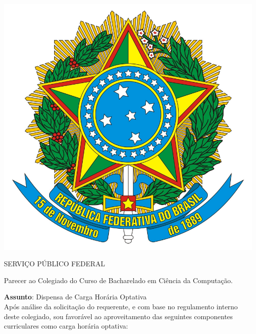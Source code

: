 \documentclass[10pt]{scrartcl}
\begin{document}
	\begin{minipage}{0.08\textwidth}
	\includegraphics[width=\textwidth]{republica} 
	\end{minipage} 
	\begin{minipage}{5.5cm}
	\centering
	SERVI\c{C}O PÚBLICO FEDERAL
	\end{minipage} 
	\hfill

\vspace{1cm}
\begin{center}
\large
Parecer ao Colegiado do Curso de Bacharelado em Ciência da Computa\c{c}ão. 
\end{center}

\textbf{Assunto}: Dispensa de Carga Horária Optativa\\

Após análise da solicita\c{c}ão do requerente, e  com base no regulamento interno deste colegiado, sou favorável ao aproveitamento das seguintes componentes curriculares como carga horária optativa:
\begin{itemize}
\end{itemize}
\end{document}
